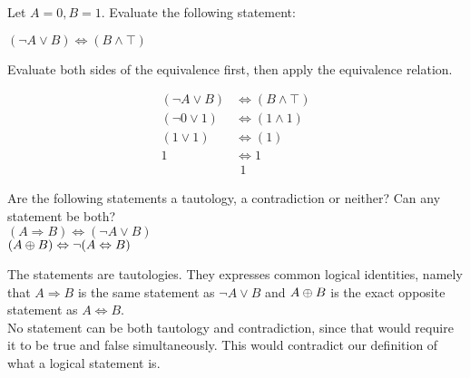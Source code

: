 \begin{problem}
  Let \(A=0, B=1\). Evaluate the following statement:\\
  \begin{center}
    \((\neg A \lor B) \Leftrightarrow (B \land \top)\)
  \end{center}

  \begin{hint}
    Evaluate both sides of the equivalence first, then apply the equivalence relation.
  \end{hint}

  \begin{sol}
    \begin{align*}
      (\neg A \lor B) &\Leftrightarrow (B \land \top)\\
      (\neg 0 \lor 1) &\Leftrightarrow (1 \land 1)\\
      (1 \lor 1) &\Leftrightarrow (1)\\
      1 &\Leftrightarrow 1\\
      &\ \, 1
    \end{align*}
  \end{sol}
\end{problem}

\begin{problem}
  Are the following statements a tautology, a contradiction or neither?
  Can any statement be both?\\
  \((A \Rightarrow B) \Leftrightarrow (\neg A \lor B)\)\\
  \((A \oplus B) \Leftrightarrow \neg (A \Leftrightarrow B)\)

  \begin{sol}
    The statements are tautologies. They expresses common logical identities, namely
    that \(A \Rightarrow B\) is the same statement as \(\neg A \lor B\)
    and \(A \oplus B\) is the exact opposite statement as \(A \Leftrightarrow B\).\\
    No statement can be both tautology and contradiction, since that would
    require it to be true and false simultaneously. This would contradict our
    definition of what a logical statement is.
  \end{sol}
\end{problem}
